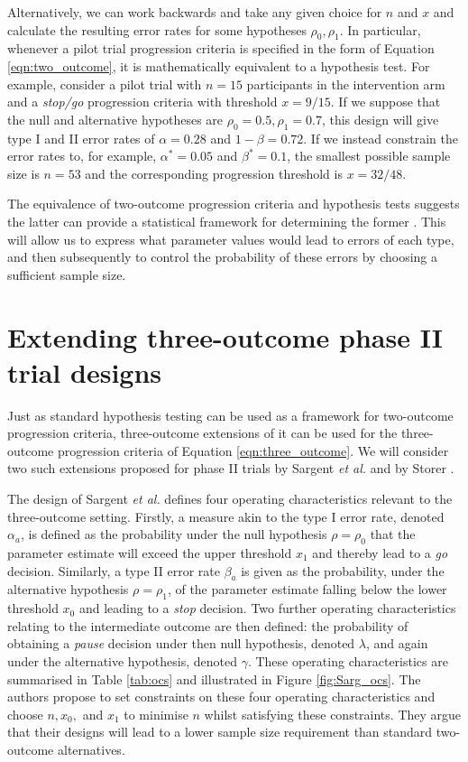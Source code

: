 \documentclass{bmcart}
\begin{document}
Alternatively, we can work backwards and take any given choice for $n$ and $x$ and calculate the resulting error rates for some hypotheses $\rho_0, \rho_1$. In particular, whenever a pilot trial progression criteria is specified in the form of Equation \ref{eqn:two_outcome}, it is mathematically equivalent to a hypothesis test. For example, consider a pilot trial with $n = 15$ participants in the intervention arm and a \emph{stop/go} progression criteria with threshold $x = 9/15$. If we suppose that the null and alternative hypotheses are $\rho_0 = 0.5, \rho_1 = 0.7$, this design will give type I and II error rates of $\alpha = 0.28$ and $1 - \beta = 0.72$. If we instead constrain the error rates to, for example, $\alpha^* = 0.05$ and $\beta^* = 0.1$, the smallest possible sample size is $n = 53$ and the corresponding progression threshold is $x = 32/48$. 

The equivalence of two-outcome progression criteria and hypothesis tests suggests the latter can provide a statistical framework for determining the former \cite{Lewis2021a}. This will allow us to express what parameter values would lead to errors of each type, and then subsequently to control the probability of these errors by choosing a sufficient sample size.

\section{Extending three-outcome phase II trial designs}\label{sec:review}

Just as standard hypothesis testing can be used as a framework for two-outcome progression criteria, three-outcome extensions of it can be used for the three-outcome progression criteria of Equation \ref{eqn:three_outcome}. We will consider two such extensions proposed for phase II trials by Sargent \emph{et al.} \cite{Sargent2001} and by Storer \cite{Storer1992}.

The design of Sargent \emph{et al.} defines four operating characteristics relevant to the three-outcome setting. Firstly, a measure akin to the type I error rate, denoted $\alpha_a$, is defined as the probability under the null hypothesis $\rho = \rho_0$ that the parameter estimate will exceed the upper threshold $x_1$ and thereby lead to a \emph{go} decision. Similarly, a type II error rate $\beta_a$ is given as the probability, under the alternative hypothesis $\rho = \rho_1$, of the parameter estimate falling below the lower threshold $x_0$ and leading to a \emph{stop} decision. Two further operating characteristics relating to the intermediate outcome are then defined: the probability of obtaining a \emph{pause} decision under then null hypothesis, denoted $\lambda$, and again under the alternative hypothesis, denoted $\gamma$. These operating characteristics are summarised in Table \ref{tab:ocs} and illustrated in Figure \ref{fig:Sarg_ocs}. The authors propose to set constraints on these four operating characteristics and choose $n, x_0,$ and $x_1$ to minimise $n$ whilst satisfying these constraints. They argue that their designs will lead to a lower sample size requirement than standard two-outcome alternatives.
\end{document}
